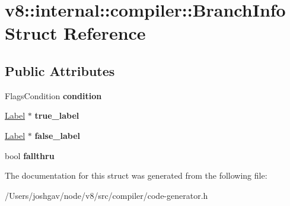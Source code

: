 \hypertarget{structv8_1_1internal_1_1compiler_1_1_branch_info}{}\section{v8\+:\+:internal\+:\+:compiler\+:\+:Branch\+Info Struct Reference}
\label{structv8_1_1internal_1_1compiler_1_1_branch_info}
\subsection*{Public Attributes}
\begin{DoxyCompactItemize}
\item 
Flags\+Condition {\bfseries condition}\hypertarget{structv8_1_1internal_1_1compiler_1_1_branch_info_a9861cd47da8b1fa2e4ec197e2df02edd}{}\label{structv8_1_1internal_1_1compiler_1_1_branch_info_a9861cd47da8b1fa2e4ec197e2df02edd}

\item 
\hyperlink{classv8_1_1internal_1_1_label}{Label} $\ast$ {\bfseries true\+\_\+label}\hypertarget{structv8_1_1internal_1_1compiler_1_1_branch_info_a8e027905e3c008f6e4eb8a6a84e0038a}{}\label{structv8_1_1internal_1_1compiler_1_1_branch_info_a8e027905e3c008f6e4eb8a6a84e0038a}

\item 
\hyperlink{classv8_1_1internal_1_1_label}{Label} $\ast$ {\bfseries false\+\_\+label}\hypertarget{structv8_1_1internal_1_1compiler_1_1_branch_info_a4c3da6b60046d8d265e5277abdf07c46}{}\label{structv8_1_1internal_1_1compiler_1_1_branch_info_a4c3da6b60046d8d265e5277abdf07c46}

\item 
bool {\bfseries fallthru}\hypertarget{structv8_1_1internal_1_1compiler_1_1_branch_info_a516a7f72d06a0b7cf755a0b8bc81d627}{}\label{structv8_1_1internal_1_1compiler_1_1_branch_info_a516a7f72d06a0b7cf755a0b8bc81d627}

\end{DoxyCompactItemize}


The documentation for this struct was generated from the following file\+:\begin{DoxyCompactItemize}
\item 
/\+Users/joshgav/node/v8/src/compiler/code-\/generator.\+h\end{DoxyCompactItemize}
